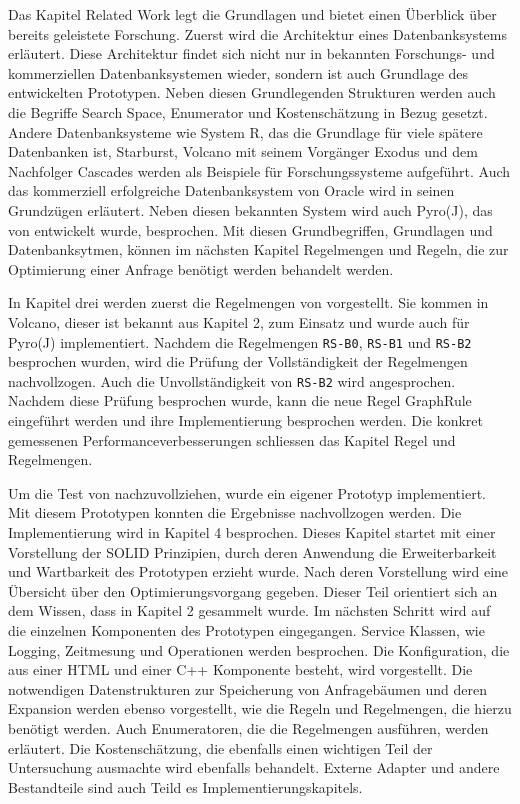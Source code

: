 Das Kapitel Related Work legt die Grundlagen und bietet einen Überblick über bereits geleistete Forschung. Zuerst wird die Architektur eines Datenbanksystems erläutert. Diese Architektur findet sich nicht nur in bekannten Forschungs- und kommerziellen Datenbanksystemen wieder, sondern ist auch Grundlage des entwickelten Prototypen. Neben diesen Grundlegenden Strukturen werden auch die Begriffe Search Space, Enumerator und Kostenschätzung in Bezug gesetzt. Andere Datenbanksysteme wie System R, das die Grundlage für viele spätere Datenbanken ist, Starburst, Volcano mit seinem Vorgänger Exodus und dem Nachfolger Cascades werden als Beispiele für Forschungssysteme aufgeführt. Auch das kommerziell erfolgreiche Datenbanksystem von Oracle wird in seinen Grundzügen erläutert. Neben diesen bekannten System wird auch Pyro(J), das von \cite{roy2001multi} entwickelt wurde, besprochen. Mit diesen Grundbegriffen, Grundlagen und Datenbanksytmen, können im nächsten Kapitel Regelmengen und Regeln, die zur Optimierung einer Anfrage benötigt werden behandelt werden.

In Kapitel drei werden zuerst die Regelmengen von \cite{pellenkoft1997complexity} vorgestellt. Sie kommen in Volcano, dieser ist bekannt aus Kapitel 2, zum Einsatz und wurde auch für Pyro(J) implementiert. Nachdem die Regelmengen \texttt{RS-B0}, \texttt{RS-B1} und \texttt{RS-B2} besprochen wurden, wird die Prüfung der Vollständigkeit der Regelmengen nachvollzogen. Auch die Unvollständigkeit von \texttt{RS-B2} wird angesprochen. Nachdem diese Prüfung besprochen wurde, kann die neue Regel GraphRule eingeführt werden und ihre Implementierung besprochen werden. Die konkret gemessenen Performanceverbesserungen schliessen das Kapitel Regel und Regelmengen.



Um die Test von \cite{shanbhag2014optimizing} nachzuvollziehen, wurde ein eigener Prototyp implementiert. Mit diesem Prototypen konnten die Ergebnisse nachvollzogen werden. Die Implementierung wird in Kapitel 4 besprochen. Dieses Kapitel startet mit einer Vorstellung der SOLID Prinzipien, durch deren Anwendung die Erweiterbarkeit und Wartbarkeit des Prototypen erzieht wurde. Nach deren Vorstellung wird eine Übersicht über den Optimierungsvorgang gegeben. Dieser Teil orientiert sich an dem Wissen, dass in Kapitel 2 gesammelt wurde. Im nächsten Schritt wird auf die einzelnen Komponenten des Prototypen eingegangen. Service Klassen, wie Logging, Zeitmesung und Operationen werden besprochen. Die Konfiguration, die aus einer HTML und einer C++ Komponente besteht, wird vorgestellt. Die notwendigen Datenstrukturen zur Speicherung von Anfragebäumen und deren Expansion werden ebenso vorgestellt, wie die Regeln und Regelmengen, die hierzu benötigt werden. Auch Enumeratoren, die die Regelmengen ausführen, werden erläutert. Die Kostenschätzung, die ebenfalls einen wichtigen Teil der Untersuchung ausmachte wird ebenfalls behandelt. Externe Adapter und andere Bestandteile sind auch Teild es Implementierungskapitels.



